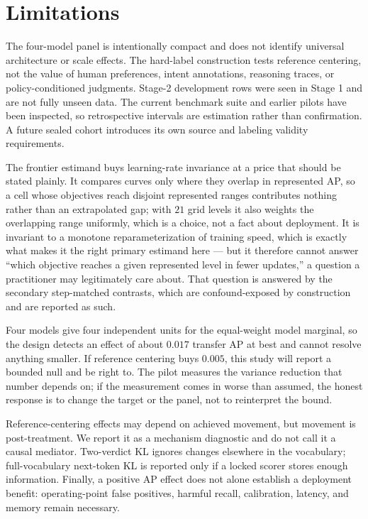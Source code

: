 \section{Limitations}

The four-model panel is intentionally compact and does not identify universal
architecture or scale effects. The hard-label construction tests reference
centering, not the value of human preferences, intent annotations, reasoning
traces, or policy-conditioned judgments. Stage-2 development rows were seen in
Stage 1 and are not fully unseen data. The current benchmark suite and earlier
pilots have been inspected, so retrospective intervals are estimation rather
than confirmation. A future sealed cohort introduces its own source and labeling
validity requirements.

The frontier estimand buys learning-rate invariance at a price that should be
stated plainly. It compares curves only where they overlap in represented AP, so a
cell whose objectives reach disjoint represented ranges contributes nothing rather
than an extrapolated gap; with $21$ grid levels it also weights the overlapping
range uniformly, which is a choice, not a fact about deployment. It is invariant
to a monotone reparameterization of training speed, which is exactly what makes it
the right primary estimand here --- but it therefore cannot answer ``which
objective reaches a given represented level in fewer updates,'' a question a
practitioner may legitimately care about. That question is answered by the
secondary step-matched contrasts, which are confound-exposed by construction and
are reported as such.

Four models give four independent units for the equal-weight model marginal, so
the design detects an effect of about $0.017$ transfer AP at best and cannot
resolve anything smaller. If reference centering buys $0.005$, this study will
report a bounded null and be right to. The pilot measures the variance reduction
that number depends on; if the measurement comes in worse than assumed, the
honest response is to change the target or the panel, not to reinterpret the
bound.

Reference-centering effects may depend on achieved movement, but movement is
post-treatment. We report it as a mechanism diagnostic and do not call it a
causal mediator. Two-verdict KL ignores changes elsewhere in the vocabulary;
full-vocabulary next-token KL is reported only if a locked scorer stores enough
information. Finally, a positive AP effect does not alone establish a deployment
benefit: operating-point false positives, harmful recall, calibration, latency,
and memory remain necessary.

